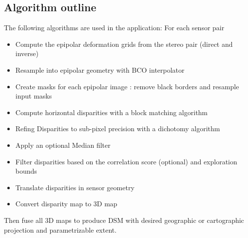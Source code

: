 \subsection{Algorithm outline}

The following algorithms are used in the application:
For each sensor pair
\begin{itemize}
\item Compute the epipolar deformation grids from the stereo pair (direct and
inverse)
\item Resample into epipolar geometry with BCO interpolator
\item Create masks for each epipolar image : remove black borders and resample input masks
\item Compute horizontal disparities with a block matching algorithm
\item Refing Disparities to sub-pixel precision with a dichotomy algorithm
\item Apply an optional Median filter 
\item Filter disparities based on the correlation score (optional) and
exploration bounds
\item Translate disparities in sensor geometry
\item Convert disparity map to 3D map
\end{itemize}

Then fuse all 3D maps to produce DSM with desired geographic or cartographic
projection and parametrizable extent.



